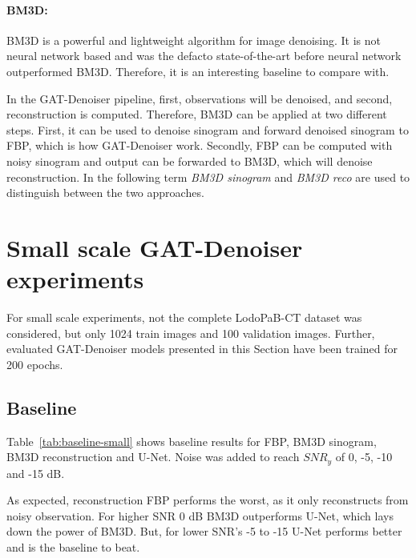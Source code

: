\paragraph{BM3D:}
BM3D is a powerful and lightweight algorithm for image denoising. 
It is not neural network based and was the defacto state-of-the-art before neural network outperformed
BM3D. Therefore, it is an interesting baseline to compare with.

In the GAT-Denoiser pipeline, first, observations will be denoised, and second, reconstruction is computed.
Therefore, BM3D can be applied at two different steps. First, it can be used to denoise sinogram
and forward denoised sinogram to FBP, which is how GAT-Denoiser work. Secondly, FBP can be
computed with noisy sinogram and output can be forwarded to BM3D, which will denoise reconstruction.
In the following term \textit{BM3D sinogram} and \textit{BM3D reco} 
are used to distinguish between the two approaches.

\section{Small scale GAT-Denoiser experiments}
For small scale experiments, not the complete LodoPaB-CT dataset was considered, but only 1024 train images
and 100 validation images. 
Further, evaluated GAT-Denoiser models presented in this Section have been trained for 200 epochs.

\subsection{Baseline}

Table~\ref{tab:baseline-small} shows baseline results for FBP, BM3D sinogram, BM3D reconstruction and U-Net.
Noise was added to reach $\textit{SNR}_y$ of 0, -5, -10 and -15 dB.

As expected, reconstruction FBP performs the worst, as it only reconstructs from noisy observation. 
For higher SNR 0 dB BM3D outperforms U-Net, which lays down the power of BM3D.
But, for lower SNR's -5 to -15 U-Net performs better and is the baseline to beat.

